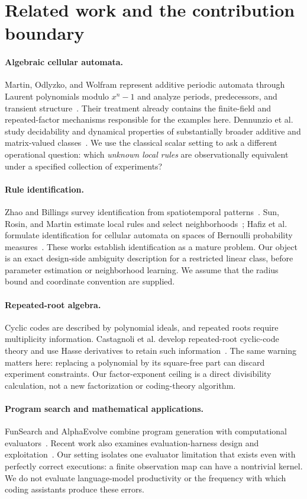 \documentclass[11pt]{article}
\begin{document}
\section{Related work and the contribution boundary}
\paragraph{Algebraic cellular automata.}
Martin, Odlyzko, and Wolfram represent additive periodic automata through Laurent polynomials modulo $x^n-1$ and analyze periods, predecessors, and transient structure~\cite{martin1984}. Their treatment already contains the finite-field and repeated-factor mechanisms responsible for the examples here. Dennunzio et al. study decidability and dynamical properties of substantially broader additive and matrix-valued classes~\cite{dennunzio2020}. We use the classical scalar setting to ask a different operational question: which \emph{unknown local rules} are observationally equivalent under a specified collection of experiments?

\paragraph{Rule identification.}
Zhao and Billings survey identification from spatiotemporal patterns~\cite{zhao2006}. Sun, Rosin, and Martin estimate local rules and select neighborhoods~\cite{sun2011}; Hafiz et al. formulate identification for cellular automata on spaces of Bernoulli probability measures~\cite{hafiz2025}. These works establish identification as a mature problem. Our object is an exact design-side ambiguity description for a restricted linear class, before parameter estimation or neighborhood learning. We assume that the radius bound and coordinate convention are supplied.

\paragraph{Repeated-root algebra.}
Cyclic codes are described by polynomial ideals, and repeated roots require multiplicity information. Castagnoli et al. develop repeated-root cyclic-code theory and use Hasse derivatives to retain such information~\cite{castagnoli1991}. The same warning matters here: replacing a polynomial by its square-free part can discard experiment constraints. Our factor-exponent ceiling is a direct divisibility calculation, not a new factorization or coding-theory algorithm.

\paragraph{Program search and mathematical applications.}
FunSearch and AlphaEvolve combine program generation with computational evaluators~\cite{funsearch,alphaevolve}. Recent work also examines evaluation-harness design and exploitation~\cite{harness2026}. Our setting isolates one evaluator limitation that exists even with perfectly correct executions: a finite observation map can have a nontrivial kernel. We do not evaluate language-model productivity or the frequency with which coding assistants produce these errors.
\end{document}

